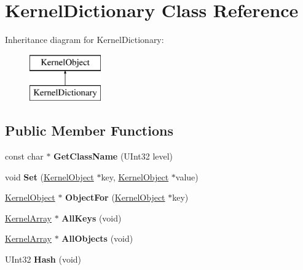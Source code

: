 \hypertarget{class_kernel_dictionary}{}\section{Kernel\+Dictionary Class Reference}
\label{class_kernel_dictionary}
Inheritance diagram for Kernel\+Dictionary\+:\begin{figure}[H]
\begin{center}
\leavevmode
\includegraphics[height=2.000000cm]{class_kernel_dictionary}
\end{center}
\end{figure}
\subsection*{Public Member Functions}
\begin{DoxyCompactItemize}
\item 
\mbox{\label{class_kernel_dictionary_aa0a3d7320d68f5b3fc983a2bf7da6c4f}} 
const char $\ast$ {\bfseries Get\+Class\+Name} (U\+Int32 level)
\item 
\mbox{\label{class_kernel_dictionary_a96855a57786d2f703d95f4c4822cda70}} 
void {\bfseries Set} (\hyperlink{class_kernel_object}{Kernel\+Object} $\ast$key, \hyperlink{class_kernel_object}{Kernel\+Object} $\ast$value)
\item 
\mbox{\label{class_kernel_dictionary_aef20dcde13386e00547ce7e86d3ee8c6}} 
\hyperlink{class_kernel_object}{Kernel\+Object} $\ast$ {\bfseries Object\+For} (\hyperlink{class_kernel_object}{Kernel\+Object} $\ast$key)
\item 
\mbox{\label{class_kernel_dictionary_a525981ef89ec2e1e8b53e64a23dc89c8}} 
\hyperlink{class_kernel_array}{Kernel\+Array} $\ast$ {\bfseries All\+Keys} (void)
\item 
\mbox{\label{class_kernel_dictionary_a0e2bad4fd6fc1f2b32fde3a1fec2bfcb}} 
\hyperlink{class_kernel_array}{Kernel\+Array} $\ast$ {\bfseries All\+Objects} (void)
\item 
\mbox{\label{class_kernel_dictionary_a2392f74975d38531a27cdd183848457e}} 
U\+Int32 {\bfseries Hash} (void)
\end{DoxyCompactItemize}
